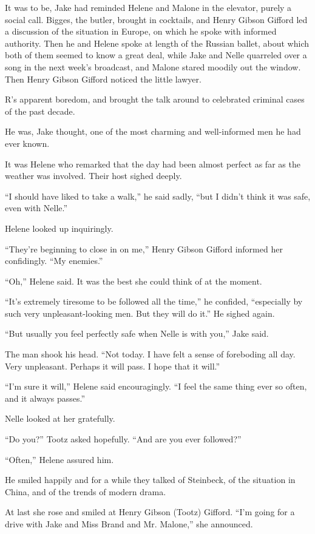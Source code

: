 \documentclass{novel}
\begin{document}
It was to be, Jake had reminded Helene and Malone in the elevator, purely a social call. Bigges, the butler, brought in cocktails, and Henry Gibson Gifford led a discussion of the situation in Europe, on which he spoke with informed authority. Then he and Helene spoke at length of the Russian ballet, about which both of them seemed to know a great deal, while Jake and Nelle quarreled over a song in the next week’s broadcast, and Malone stared moodily out the window. Then Henry Gibson Gifford noticed the little lawyer.

R’s apparent boredom, and brought the talk around to celebrated criminal cases of the past decade.

He was, Jake thought, one of the most charming and well-informed men he had ever known.

It was Helene who remarked that the day had been almost perfect as far as the weather was involved. Their host sighed deeply.

“I should have liked to take a walk,” he said sadly, “but I didn’t think it was safe, even with Nelle.”

Helene looked up inquiringly.

“They’re beginning to close in on me,” Henry Gibson Gifford informed her confidingly. “My enemies.”

“Oh,” Helene said. It was the best she could think of at the moment.

“It’s extremely tiresome to be followed all the time,” he confided, “especially by such very unpleasant-looking men. But they will do it.” He sighed again.

“But usually you feel perfectly safe when Nelle is with you,” Jake said.

The man shook his head. “Not today. I have felt a sense of foreboding all day. Very unpleasant. Perhaps it will pass. I hope that it will.”

“I’m sure it will,” Helene said encouragingly. “I feel the same thing ever so often, and it always passes.”

Nelle looked at her gratefully.

“Do you?” Tootz asked hopefully. “And are you ever followed?”

“Often,” Helene assured him.

He smiled happily and for a while they talked of Steinbeck, of the situation in China, and of the trends of modern drama.

At last she rose and smiled at Henry Gibson (Tootz) Gifford. “I’m going for a drive with Jake and Miss Brand and Mr. Malone,” she announced.
\end{document}
